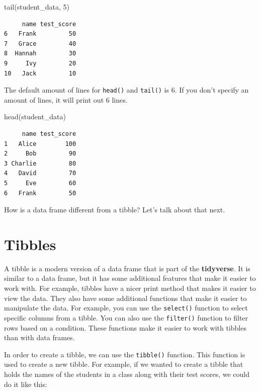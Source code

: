 \documentclass[
  letterpaper,
  DIV=11,
  numbers=noendperiod]{scrreprt}
\newenvironment{Shaded}{\begin{snugshade}}{\end{snugshade}}
\newcommand{\DecValTok}[1]{\textcolor[rgb]{0.68,0.00,0.00}{#1}}
\newcommand{\FunctionTok}[1]{\textcolor[rgb]{0.28,0.35,0.67}{#1}}
\newcommand{\NormalTok}[1]{\textcolor[rgb]{0.00,0.23,0.31}{#1}}
\begin{document}
\begin{Shaded}
\begin{Highlighting}[]
\FunctionTok{tail}\NormalTok{(student\_data, }\DecValTok{5}\NormalTok{)}
\end{Highlighting}
\end{Shaded}

\begin{verbatim}
     name test_score
6   Frank         50
7   Grace         40
8  Hannah         30
9     Ivy         20
10   Jack         10
\end{verbatim}

The default amount of lines for \texttt{head()} and \texttt{tail()} is
6. If you don't specify an amount of lines, it will print out 6 lines.

\begin{Shaded}
\begin{Highlighting}[]
\FunctionTok{head}\NormalTok{(student\_data)}
\end{Highlighting}
\end{Shaded}

\begin{verbatim}
     name test_score
1   Alice        100
2     Bob         90
3 Charlie         80
4   David         70
5     Eve         60
6   Frank         50
\end{verbatim}

How is a data frame different from a tibble? Let's talk about that next.

\section*{Tibbles}\label{tibbles}


A tibble is a modern version of a data frame that is part of the
\textbf{tidyverse}. It is similar to a data frame, but it has some
additional features that make it easier to work with. For example,
tibbles have a nicer print method that makes it easier to view the data.
They also have some additional functions that make it easier to
manipulate the data. For example, you can use the \texttt{select()}
function to select specific columns from a tibble. You can also use the
\texttt{filter()} function to filter rows based on a condition. These
functions make it easier to work with tibbles than with data frames.

In order to create a tibble, we can use the \texttt{tibble()} function.
This function is used to create a new tibble. For example, if we wanted
to create a tibble that holds the names of the students in a class along
with their test scores, we could do it like this:
\end{document}
